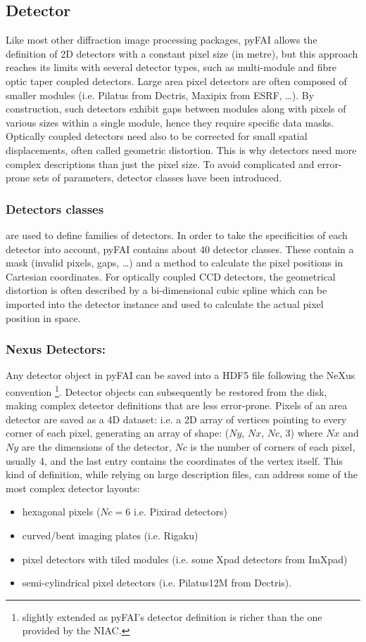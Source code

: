 \documentclass{iucr}
\begin{document}
\subsection{Detector}
Like most other diffraction image processing packages, pyFAI allows the definition of
2D detectors with a constant pixel size (in metre), but this approach reaches
its limits with several detector types, such as multi-module and fibre optic
taper coupled detectors.
Large area pixel detectors are often composed of smaller modules (i.e. Pilatus
from Dectris, Maxipix from ESRF,
\ldots).
By construction, such detectors exhibit gaps between modules along with
pixels of various sizes within a single module, hence they require specific
data masks.
Optically coupled detectors need also to be corrected
for small spatial displacements, often called geometric distortion.
This is why detectors need more complex descriptions than just the pixel size.
To avoid complicated and error-prone sets of parameters, detector classes have
been introduced.

\subsubsection{Detectors classes} are used to define families of detectors.
In order to take the specificities of each detector into account, pyFAI
contains about 40 detector classes. These contain a mask
(invalid pixels, gaps, \ldots) and a method to calculate the pixel positions in Cartesian
coordinates.
For optically coupled CCD detectors, the geometrical distortion is often
described by a bi-dimensional cubic spline which can be imported into
the detector instance and used to calculate the actual pixel position in space.

\subsubsection{Nexus Detectors:}
Any detector object in pyFAI can be saved into a HDF5 file following the NeXus
convention \cite{nexus}\footnote{slightly extended as pyFAI's detector
definition is richer than the one provided by the NIAC.}.
Detector objects can subsequently be restored from the disk, making
complex detector definitions that are less error-prone.
Pixels of an area detector are saved as a 4D dataset: i.e. a 2D
array of vertices pointing to every corner of each pixel, generating
an array of shape: ($Ny$, $Nx$, $Nc$, 3) where $Nx$ and $Ny$ are the dimensions of the
detector, $Nc$ is the number of corners of each pixel, usually 4, and the last
entry contains the coordinates of the vertex itself.
This kind of definition, while relying on large description files,
can address some of the most complex detector layouts:
\begin{itemize}
  \item hexagonal pixels ($Nc=6$ i.e. Pixirad detectors)
  \item curved/bent imaging plates (i.e. Rigaku)
  \item pixel detectors with tiled modules  (i.e. some Xpad detectors from
  ImXpad)
  \item semi-cylindrical pixel detectors (i.e. Pilatus12M from Dectris).
\end{itemize}
\end{document}
